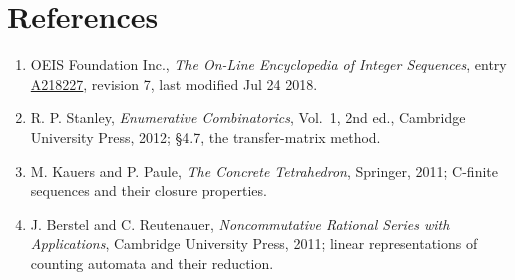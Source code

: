 \documentclass[11pt]{article}
\theoremstyle{definition}
\begin{document}
\section{References}

\begin{enumerate}

\item OEIS Foundation Inc., \emph{The On-Line Encyclopedia of Integer Sequences}, entry \href{https://oeis.org/A218227}{A218227}, revision 7, last modified Jul 24 2018.

\item R. P. Stanley, \emph{Enumerative Combinatorics}, Vol.~1, 2nd ed., Cambridge University Press, 2012; \S4.7, the transfer-matrix method.

\item M. Kauers and P. Paule, \emph{The Concrete Tetrahedron}, Springer, 2011; C-finite sequences and their closure properties.

\item J. Berstel and C. Reutenauer, \emph{Noncommutative Rational Series with Applications}, Cambridge University Press, 2011; linear representations of counting automata and their reduction.

\end{enumerate}
\end{document}
